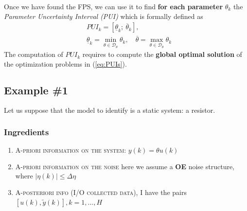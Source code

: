 Once we have found the FPS, we can use it to find \textbf{for each parameter} $\theta_k$ the \textit{Parameter Uncertainty Interval (PUI)} which is formally defined as
{\large{
    \begin{align}
            &PUI_k = [\underline{\theta}_k;\ \overline{\theta}_k], \\
        &\underline{\theta}_k=\min_{\theta\in\mathcal{D}_\theta} {\theta_k}, \quad \overline{\theta}=\max_{\theta\in\mathcal{D}_\theta} {\theta_k} \label{eq:PUIs}
    \end{align}
}}
The computation of $PUI_k$ requires to compute the \textbf{global optimal solution} of the optimization problems in (\ref{eq:PUIs}).

\subsection{Example \#1}
Let us suppose that the model to identify is a static system: a resistor.

\subsubsection{Ingredients}
\begin{enumerate}
    \item \textsc{A-priori information on the system}: $y(k)=\theta u(k)$
    \item \textsc{A-priori information on the noise} here we assume a \textbf{OE} noise structure, where $\vert \eta(k) \vert \le \Delta\eta$
    \item \textsc{A-posteriori info (I/O collected data)}, I have the pairs $[u(k), \tilde{y}(k)], k=1,...,H$
\end{enumerate}

